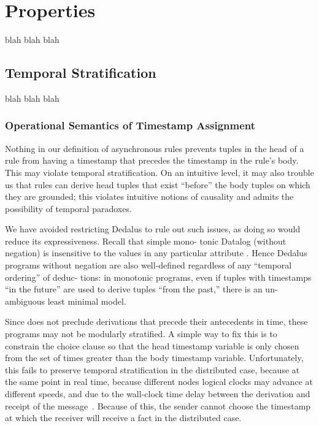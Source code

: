 \section{Properties}

blah blah blah

\subsection{Temporal Stratification}

blah blah blah

\subsubsection{Operational Semantics of Timestamp Assignment}

Nothing in our definition of asynchronous rules prevents tuples
in the head of a rule from having a timestamp that precedes the
timestamp in the rule’s body. This may violate temporal stratification.
On an intuitive level, it may also trouble us that rules can
derive head tuples that exist ``before'' the body tuples on which they
are grounded; this violates intuitive notions of causality and admits
the possibility of temporal paradoxes.

We have avoided restricting Dedalus to rule out such issues, as
doing so would reduce its expressiveness. Recall that simple mono-
tonic Datalog (without negation) is insensitive to the values in any
particular attribute . Hence Dedalus programs without negation are
also well-defined regardless of any ``temporal ordering'' of deduc-
tions: in monotonic programs, even if tuples with timestamps ``in
the future'' are used to derive tuples ``from the past,'' there is an un-
ambiguous least minimal model.


Since  does not preclude derivations that precede their antecedents in time, these programs may not be modularly stratified.  A simple way to fix this is to constrain the choice clause so that the head timestamp variable is only chosen from the set of times greater than the body timestamp variable.  Unfortunately, this fails to preserve temporal stratification in the distributed case, because at the same point in real time, because different nodes logical clocks may advance at different speeds, and due to the wall-clock time delay between the derivation and receipt of the message~.  Because of this, the sender cannot choose the timestamp at which the receiver will receive a  fact in the distributed case. 

